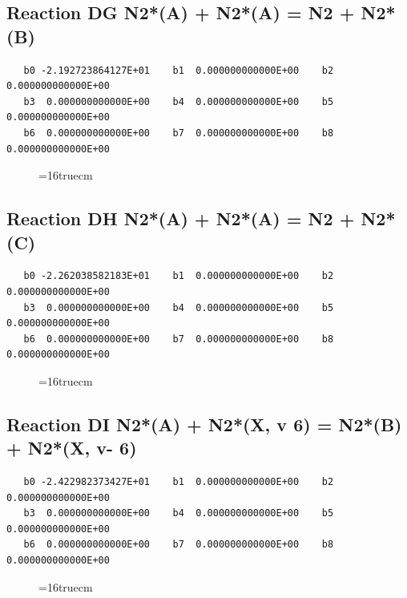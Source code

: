 \documentclass[12pt,dvipdfm]{article}
\begin{document}
\subsection{
Reaction DG N2*(A) + N2*(A)  = N2 + N2*(B)}
\begin{small}\begin{verbatim}
   b0 -2.192723864127E+01    b1  0.000000000000E+00    b2  0.000000000000E+00
   b3  0.000000000000E+00    b4  0.000000000000E+00    b5  0.000000000000E+00
   b6  0.000000000000E+00    b7  0.000000000000E+00    b8  0.000000000000E+00
   \end{verbatim}\end{small}
\begin{figure}[h!]
\label{n2rates}
\epsfxsize=16truecm
\end{figure}
\newpage

\subsection{
Reaction DH N2*(A) + N2*(A)  = N2 + N2*(C)}
\begin{small}\begin{verbatim}
   b0 -2.262038582183E+01    b1  0.000000000000E+00    b2  0.000000000000E+00
   b3  0.000000000000E+00    b4  0.000000000000E+00    b5  0.000000000000E+00
   b6  0.000000000000E+00    b7  0.000000000000E+00    b8  0.000000000000E+00
   \end{verbatim}\end{small}
\begin{figure}[h!]
\label{n2rates}
\epsfxsize=16truecm
\end{figure}
\newpage

\subsection{
Reaction DI N2*(A) + N2*(X, v  6)  = N2*(B) + N2*(X, v- 6)}
\begin{small}\begin{verbatim}
   b0 -2.422982373427E+01    b1  0.000000000000E+00    b2  0.000000000000E+00
   b3  0.000000000000E+00    b4  0.000000000000E+00    b5  0.000000000000E+00
   b6  0.000000000000E+00    b7  0.000000000000E+00    b8  0.000000000000E+00
   \end{verbatim}\end{small}
\begin{figure}[h!]
\label{n2rates}
\epsfxsize=16truecm
\end{figure}
\newpage
\end{document}
